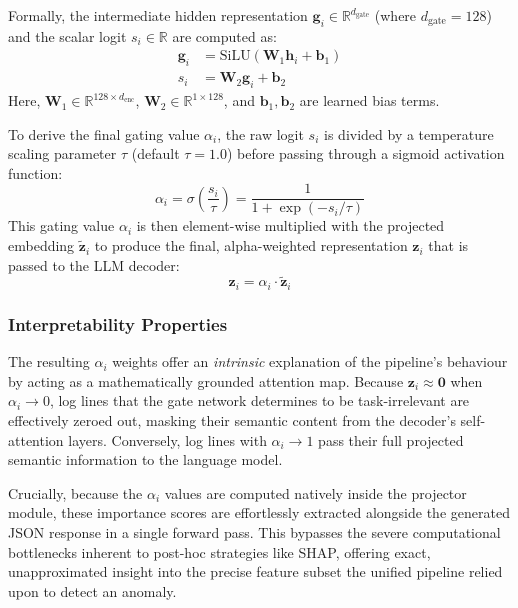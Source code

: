 Formally, the intermediate hidden representation $\mathbf{g}_i \in \mathbb{R}^{d_{\text{gate}}}$ (where $d_{\text{gate}} = 128$) and the scalar logit $s_i \in \mathbb{R}$ are computed as:
\begin{align}
    \mathbf{g}_i &= \text{SiLU}(\mathbf{W}_1 \mathbf{h}_i + \mathbf{b}_1) \label{eq:gate-hidden} \\
    s_i &= \mathbf{W}_2 \mathbf{g}_i + \mathbf{b}_2 \label{eq:gate-logit}
\end{align}
Here, $\mathbf{W}_1 \in \mathbb{R}^{128 \times d_{\text{enc}}}$, $\mathbf{W}_2 \in \mathbb{R}^{1 \times 128}$, and $\mathbf{b}_1, \mathbf{b}_2$ are learned bias terms.

To derive the final gating value $\alpha_i$, the raw logit $s_i$ is divided by a temperature scaling parameter $\tau$ (default $\tau = 1.0$) before passing through a sigmoid activation function:
\begin{equation}\label{eq:gate-alpha}
    \alpha_i = \sigma\left( \frac{s_i}{\tau} \right) = \frac{1}{1 + \exp(-s_i / \tau)}
\end{equation}
This gating value $\alpha_i$ is then element-wise multiplied with the projected embedding $\tilde{\mathbf{z}}_i$ to produce the final, alpha-weighted representation $\mathbf{z}_i$ that is passed to the LLM decoder:
\begin{equation}\label{eq:gate-final}
    \mathbf{z}_i = \alpha_i \cdot \tilde{\mathbf{z}}_i
\end{equation}

\subsubsection{Interpretability Properties}

The resulting $\alpha_i$ weights offer an \textit{intrinsic} explanation of the pipeline's behaviour by acting as a mathematically grounded attention map. Because $\mathbf{z}_i \approx \mathbf{0}$ when $\alpha_i \to 0$, log lines that the gate network determines to be task-irrelevant are effectively zeroed out, masking their semantic content from the decoder's self-attention layers. Conversely, log lines with $\alpha_i \to 1$ pass their full projected semantic information to the language model. 

Crucially, because the $\alpha_i$ values are computed natively inside the projector module, these importance scores are effortlessly extracted alongside the generated JSON response in a single forward pass. This bypasses the severe computational bottlenecks inherent to post-hoc strategies like SHAP, offering exact, unapproximated insight into the precise feature subset the unified pipeline relied upon to detect an anomaly.


